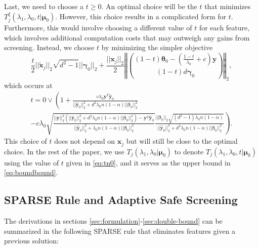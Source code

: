 Last, we need to choose a $t\geq 0$. An optimal choice will be the $t$ that minimizes $T^\xi_j(\lambda_1,\lambda_0,t|\boldsymbol\mu_0)$. However, this choice results in a complicated form for $t$. Furthermore, this would involve choosing a different value of $t$ for each feature, which involves additional computation costs that may outweigh any gains from screening. Instead, we choose $t$ by minimizing the simpler objective
\begin{equation}
    \frac{t}{2}||\tilde{\boldsymbol x}_j||_2\sqrt{d^2-1}||\boldsymbol\gamma_{0}||_2+\frac{||\boldsymbol x_j||_2}{2}\left\Vert\binom{(1-t)\boldsymbol\theta_{0}-\left(\frac{1-t}{\lambda_0}+c\right)\boldsymbol y}{(1-t)d\boldsymbol\gamma_{0}}\right\Vert_2,
\end{equation}
which occurs at
\begin{multline}
    \label{eq:tn0}
    t=0\vee\left(1+\frac{c\lambda_0\boldsymbol y^T\hat{\boldsymbol y}_{0}}{||\hat{\boldsymbol y}_{0}||_2^2+d^2\lambda_0n(1-\alpha)||\boldsymbol\beta_{0}||_2^2}\right.\\
    \left.-c\lambda_0\sqrt{\frac{||\boldsymbol y||_2^2\left(||\hat{\boldsymbol y}_{0}||_2^2+d^2\lambda_0n(1-\alpha)||\boldsymbol\beta_{0}||_2^2\right)-\boldsymbol y^T\hat{\boldsymbol y}_{0}}{||\hat{\boldsymbol y}_{0}||_2^2+\lambda_0n(1-\alpha)||\boldsymbol\beta_{0}||_2^2}}
    \frac{||\boldsymbol\beta_{0}||_2\sqrt{(d^2-1)\lambda_0n(1-\alpha)}}{||\hat{\boldsymbol y}_{0}||_2^2+d^2\lambda_0n(1-\alpha)||\boldsymbol\beta_{0}||_2^2}\right).
\end{multline}
This choice of $t$ does not depend on $\boldsymbol x_j$ but will still be close to the optimal choice. In the rest of the paper, we use $T_j(\lambda_1,\lambda_0|\boldsymbol\mu_0)$ to denote $T_j(\lambda_1,\lambda_0,t|\boldsymbol\mu_0)$ using the value of $t$ given in \eqref{eq:tn0}, and it serves as the upper bound in \eqref{eq:boundbound}.

\subsection{SPARSE Rule and Adaptive Safe Screening}

The derivations in sections \ref{sec:formulation}-\ref{sec:double-bound} can be summarized in the following SPARSE rule that eliminates features given a previous solution:

